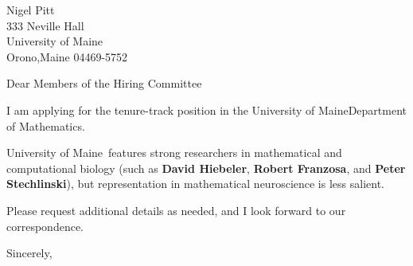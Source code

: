 




	
	
	\def\School{University of Maine}
	
	\begin{letter}
		{Nigel Pitt\\
			333 Neville Hall\\
			University of Maine\\
			Orono,Maine 04469-5752
		}
		
		\opening{Dear Members of the Hiring Committee}
		
		
		I am applying for the tenure-track position in the \School Department of Mathematics. 
		
		
		
		\School~features strong researchers in mathematical and computational biology (such as \textbf{David Hiebeler}, \textbf{Robert Franzosa}, and \textbf{Peter Stechlinski}), but representation in mathematical neuroscience is less salient. 
		
		
		
		
		
		Please request additional details as needed, and I look forward to our correspondence.
		
		\closing{Sincerely,}
	\end{letter}
